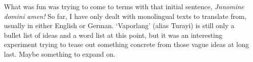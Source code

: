 \documentclass[12pt,paper=a4]{scrartcl}
\newcommand{\fw}[1]{\textit{#1}} %
\begin{document}
What was fun was trying to come to terms with that initial sentence, 
\fw{Jnn\emph{omin}e d\emph{omi}n\emph{i} am\emph{en}!} So far, I have only dealt 
with monolingual texts to translate from, usually in either English or German. 
\enquote*{Vaporlang} (alias Turayi) is still only a bullet list of ideas and a 
word list at this point, but it was an interesting experiment trying to tease 
out something concrete from those vague ideas at long last. Maybe something to 
expand on.


\pagebreak

\printglossary[style=mytable,type=\leipzigtype]

\printbibliography[heading=bibintoc]
\end{document}

